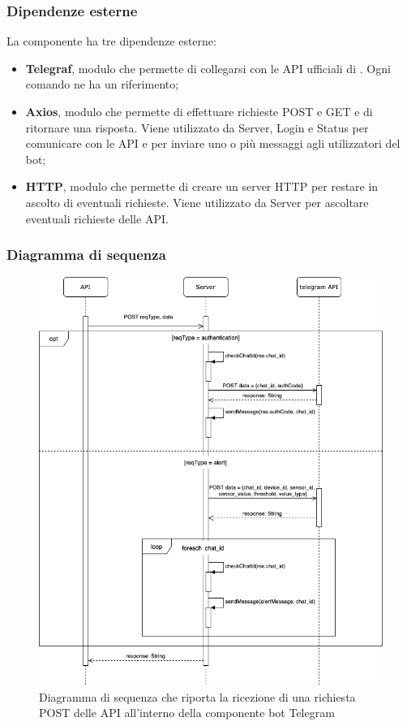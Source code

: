 \subsubsection{Dipendenze esterne}	
	La componente ha tre dipendenze esterne:
	\begin{itemize}
		\item \textbf{Telegraf}, modulo che permette di collegarsi con le API ufficiali di . Ogni comando ne ha un riferimento;
		\item \textbf{Axios}, modulo che permette di effettuare richieste POST e GET e di ritornare una risposta. Viene utilizzato da Server, Login e Status per comunicare con le API e per inviare uno o più messaggi agli utilizzatori del bot;
		\item \textbf{HTTP}, modulo che permette di creare un server HTTP per restare in ascolto di eventuali richieste. Viene utilizzato da Server per ascoltare eventuali richieste delle API.    
	\end{itemize}
\subsubsection{Diagramma di sequenza}%
	\begin{figure}[H]
		\centering
		\includegraphics[scale=0.500]{res/images/BOTTELEGRAM/TelegramRichiestaPOST.png}
		\caption{Diagramma di sequenza che riporta la ricezione di una richiesta POST delle API all'interno della componente bot Telegram}
		\label{Diagramma 20}
	\end{figure}

